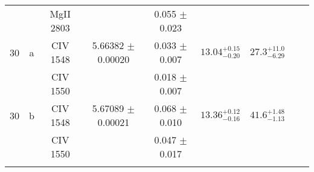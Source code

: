 \documentclass[12pt]{article}
\begin{document}
\begin{footnotesize}
\begin{longtable}{ c c c c c c c c c}
  &   & MgII     2803  &  &  0.055 $\pm$ 0.023   &   &     & 	 & \\ 
      30  & a  & CIV     1548  &  5.66382 $\pm$ 0.00020  &  0.033 $\pm$ 0.007   & $13.04_{ - 0.20}^{ + 0.15}$  & $27.3_{ - 6.29}^{ + 11.0}$    & 	 & \\ 
  &   & CIV     1550  &  &  0.018 $\pm$ 0.007   &   &     & 	 & \\ 
      30  & b  & CIV     1548  &  5.67089 $\pm$ 0.00021  &  0.068 $\pm$ 0.010   & $13.36_{ - 0.16}^{ + 0.12}$  & $41.6_{ - 1.13}^{ + 1.48}$    & 	 & \\ 
  &   & CIV     1550  &  &  0.047 $\pm$ 0.017   &   &     & 	 & \\ 
 &        &                   &                &   & 					&							&   	 	& \\  
\hline                                                                                                           
\hline                                                                                                           
\end{longtable}                                                                                                  
\end{footnotesize}                                                                                                  
\end{document}
